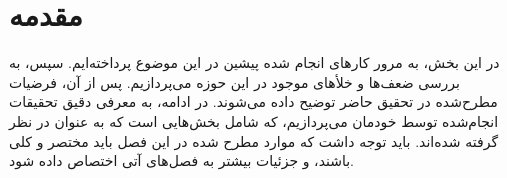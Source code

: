 
\chapter{مقدمه}

در این بخش، به مرور کارهای انجام شده پیشین در این موضوع پرداخته‌ایم. سپس، به بررسی ضعف‌ها و خلأهای موجود در این حوزه می‌پردازیم. پس از آن، فرضیات مطرح‌شده در تحقیق حاضر توضیح داده می‌شوند. در ادامه، به معرفی دقیق تحقیقات انجام‌شده توسط خودمان می‌پردازیم، که شامل بخش‌هایی است که به عنوان  در نظر گرفته شده‌اند. باید توجه داشت که موارد مطرح شده در این فصل باید مختصر و کلی باشند، و جزئیات بیشتر به فصل‌های آتی اختصاص داده شود.